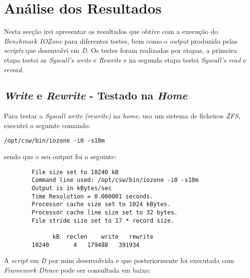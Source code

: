 \documentclass[conference,compsoc]{IEEEtran}
\begin{document}
\section{Análise dos Resultados}

Nesta secção irei apresentar os resultados que obtive com a execução do \textit{Benchmark IOZone} para diferentes testes, bem como o \textit{output} produzido pelas \textit{scripts} que desenvolvi em \textit{D}. Os testes foram realizados por etapas, a primeira etapa testei as \textit{Syscall's write} e \textit{Rewrite} e na segunda etapa testei \textit{Syscall's read} e \textit{reread}.


\subsection{\textit{Write} e \textit{Rewrite} - Testado na \textit{Home}}
Para testar a \textit{Syscall write (rewrite)} na \textit{home}, usa um sistema de ficheiros \textit{ZFS}, executei o seguinte comando:

\begin{lstlisting}
/opt/csw/bin/iozone -i0 -s10m
\end{lstlisting}

sendo que o seu output foi o seguinte:

\begin{lstlisting}
        File size set to 10240 kB
        Command line used: /opt/csw/bin/iozone -i0 -s10m
        Output is in kBytes/sec
        Time Resolution = 0.000001 seconds.
        Processor cache size set to 1024 kBytes.
        Processor cache line size set to 32 bytes.
        File stride size set to 17 * record size.
                                                                                               
              kB  reclen    write   rewrite
        10240       4   179488   391934  
\end{lstlisting}

A \textit{script} em \textit{D} por mim desenvolvida e que posteriormente foi executada com \textit{Framework Dtrace} pode ser consultada em baixo:
\end{document}
